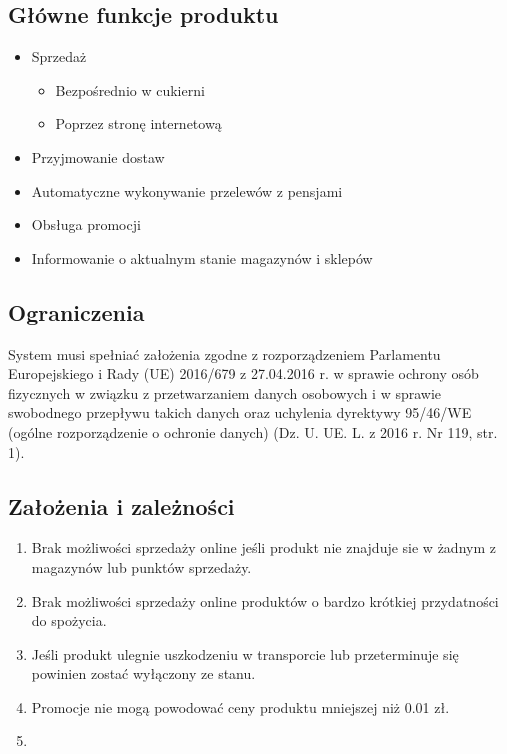\documentclass{article}
\begin{document}
\subsection{Główne funkcje produktu}
\begin{itemize}
    \item Sprzedaż
    \begin{itemize}
        \item  Bezpośrednio w cukierni
        \item  Poprzez stronę internetową
    \end{itemize}

    \item Przyjmowanie dostaw
    \item Automatyczne wykonywanie przelewów z pensjami
    \item Obsługa promocji
    \item Informowanie o aktualnym stanie magazynów i sklepów
\end{itemize}
\subsection{Ograniczenia}
System musi spełniać założenia zgodne z rozporządzeniem Parlamentu Europejskiego i Rady (UE) 2016/679 z 27.04.2016 r. w sprawie ochrony osób fizycznych w związku z przetwarzaniem danych osobowych i w sprawie swobodnego przepływu takich danych oraz uchylenia dyrektywy 95/46/WE (ogólne rozporządzenie o ochronie danych) (Dz. U. UE. L. z 2016 r. Nr 119, str. 1).

\subsection{Założenia i zależności}
\begin{enumerate}
    \item Brak możliwości sprzedaży online jeśli produkt nie znajduje sie w żadnym z magazynów lub punktów sprzedaży.
    \item Brak możliwości sprzedaży online produktów o bardzo krótkiej przydatności do spożycia.
    \item Jeśli produkt ulegnie uszkodzeniu w transporcie lub przeterminuje się powinien zostać wyłączony ze stanu.
    \item Promocje nie mogą powodować ceny produktu mniejszej niż 0.01 zł.
    \item 
\end{enumerate}
\end{document}
